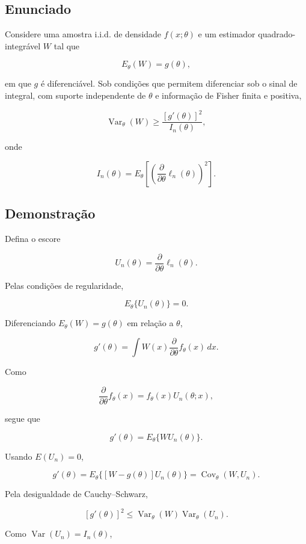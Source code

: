 \documentclass[
  letterpaper,
  DIV=11,
  numbers=noendperiod]{scrreprt}
\begin{document}
\subsection*{Enunciado}\label{enunciado-8}

Considere uma amostra i.i.d. de densidade \(f(x;\theta)\) e um estimador
quadrado-integrável \(W\) tal que

\[
E_\theta(W)=g(\theta),
\]

em que \(g\) é diferenciável. Sob condições que permitem diferenciar sob
o sinal de integral, com suporte independente de \(\theta\) e informação
de Fisher finita e positiva,

\[
\operatorname{Var}_\theta(W)
\geq
\frac{[g'(\theta)]^2}{I_n(\theta)},
\]

onde

\[
I_n(\theta)
=
E_\theta\left[
\left(
\frac{\partial}{\partial\theta}\ell_n(\theta)
\right)^2
\right].
\]

\subsection*{Demonstração}\label{demonstrauxe7uxe3o-9}

Defina o escore

\[
U_n(\theta)=\frac{\partial}{\partial\theta}\ell_n(\theta).
\]

Pelas condições de regularidade,

\[
E_\theta\{U_n(\theta)\}=0.
\]

Diferenciando \(E_\theta(W)=g(\theta)\) em relação a \(\theta\),

\[
g'(\theta)
=
\int W(x)\frac{\partial}{\partial\theta}f_\theta(x)\,dx.
\]

Como

\[
\frac{\partial}{\partial\theta}f_\theta(x)
=
f_\theta(x)U_n(\theta;x),
\]

segue que

\[
g'(\theta)
=
E_\theta\{WU_n(\theta)\}.
\]

Usando \(E(U_n)=0\),

\[
g'(\theta)
=
E_\theta\{[W-g(\theta)]U_n(\theta)\}
=
\operatorname{Cov}_\theta(W,U_n).
\]

Pela desigualdade de Cauchy--Schwarz,

\[
[g'(\theta)]^2
\leq
\operatorname{Var}_\theta(W)
\operatorname{Var}_\theta(U_n).
\]

Como \(\operatorname{Var}(U_n)=I_n(\theta)\),
\end{document}
